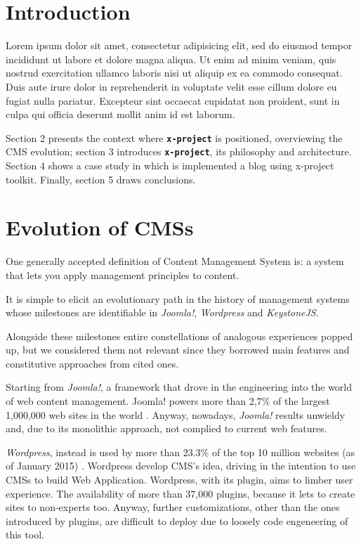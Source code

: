 \documentclass{sig-alternate}
\newcommand{\brand}[1]{\textbf{\tt #1}}
\begin{document}
%
%

%
%
\printccsdesc



\section{Introduction}
Lorem ipsum dolor sit amet, consectetur adipisicing elit, sed do eiusmod
tempor incididunt ut labore et dolore magna aliqua. Ut enim ad minim veniam,
quis nostrud exercitation ullamco laboris nisi ut aliquip ex ea commodo
consequat. Duis aute irure dolor in reprehenderit in voluptate velit esse
cillum dolore eu fugiat nulla pariatur. Excepteur sint occaecat cupidatat non
proident, sunt in culpa qui officia deserunt mollit anim id est laborum.


Section 2 presents the context where \brand{x-project} is positioned, overviewing the CMS evolution; section 3 introduces \brand{x-project}, its philosophy and architecture. Section 4 shows a case study in which is implemented a blog using x-project toolkit. Finally, section 5 draws conclusions.


\section{Evolution of CMSs}
One generally accepted definition of Content Management System is: a system that lets you apply management principles to content.

It is simple to elicit an evolutionary path in the history of management systems whose milestones are identifiable in \emph{Joomla!}, \emph{Wordpress} and \emph{KeystoneJS}.

Alongside these milestones entire constellations of analogous experiences popped up, but we considered them not relevant since they borrowed main features and constitutive approaches from cited ones. 

Starting from \emph{Joomla!}, a framework that drove in the engineering into the world of web content management. Joomla! powers more than 2,7\% of the largest 1,000,000 web sites in the world \cite{usage-cms}. Anyway, nowadays, \emph{Joomla!} results unwieldy and, due to its monolithic approach, not complied to current web features.

\emph{Wordpress}, instead is used by more than 23.3\% of the top 10 million websites (as of January 2015) \cite{usage-cms}. Wordpress develop CMS’s idea, driving in the intention to use CMSs to build Web Application. Wordpress, with its plugin, aims to limber user experience. The availability of more than 37,000 plugins, because it lets to create sites to non-experts too.
Anyway, further customizations, other than the ones introduced by plugins, are difficult to deploy due to loosely code engeneering of this tool.
\end{document}
